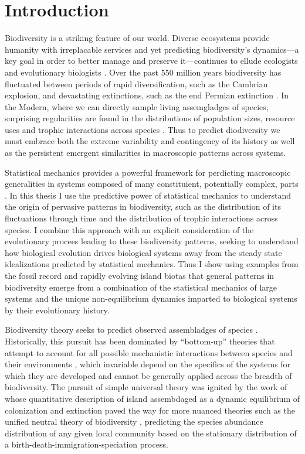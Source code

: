 \chapter*{Introduction}


Biodiversity is a striking feature of our world. Diverse ecosystems
provide humanity with irreplacable services \citep{daily1997} and yet
predicting biodiversity's dynamics---a key goal in order to better
manage and preserve it---continues to ellude ecologists and
evolutionary biologists \citep{mcgill2010, gould1985}. Over the past
550 million years biodiversity has fluctuated between periods of rapid
diversification, such as the Cambrian explosion, and devastating
extinctions, such as the end Permian extinction \citep{sepkoski1992,
  alroy08}. In the Modern, where we can directly sample living
assemgladges of species, surprising regularities are found in the
distributions of population sizes, resource uses and trophic
interactions across species \citep{brown1995, hubbell2001, nekola2007,
  harte2011, Jordano2003, nuismer2013, berlow2009}. Thus to predict
diodiversity we must embrace both the extreme variability and
contingency of its history as well as the persistent emergent
similarities in macroscopic patterns across systems.

Statistical mechanics provides a powerful framework for perdicting
macroscopic generalities in systems composed of many constituient,
potentially complex, parts \citep[e.g.][]{albert2002, sethna2006}.  In
this thesis I use the predictive power of statistical mechanics to
understand the origin of pervasive patterns in biodiversity, such as
the distribution of its fluctuations through time and the distribution
of trophic interactions across species.  I combine this approach with
an explicit consideration of the evolutionary procees leading to these
biodiversity patterns, seeking to understand how biological evolution
drives biological systems away from the steady state idealizations
predicted by statistical mechanics.  Thus I show using examples from
the fossil record and rapidly evolving island biotas that general
patterns in biodiversity emerge from a combination of the statistical
mechanics of large systems and the unique non-equilibrium dynamics
imparted to biological systems by their evolutionary history.

Biodiversity theory seeks to predict observed assembladges of species
\citep{hubbell2001}. Historically, this pursuit has been dominated by
``bottom-up'' theories that attempt to account for all possible
mechanistic interactions between species and their environments
\citep{hubbell2001, haegeman2008, harte2011}, which invariable depend
on the specifics of the systems for which they are developed and
cannot be generally applied across the breadth of biodiversity.  The
pursuit of simple universal theory was ignited by the work of
\citet{macWilson} whose quantitative description of island assembdaged
as a dynamic equilibrium of colonization and extinction paved the way
for more nuanced theories such as the unified neutral theory of
biodiversity \citep{hubbell2001}, predicting the species abundance
distribution of any given local community based on the stationary
distribution of a birth-death-immigration-speciation process.

